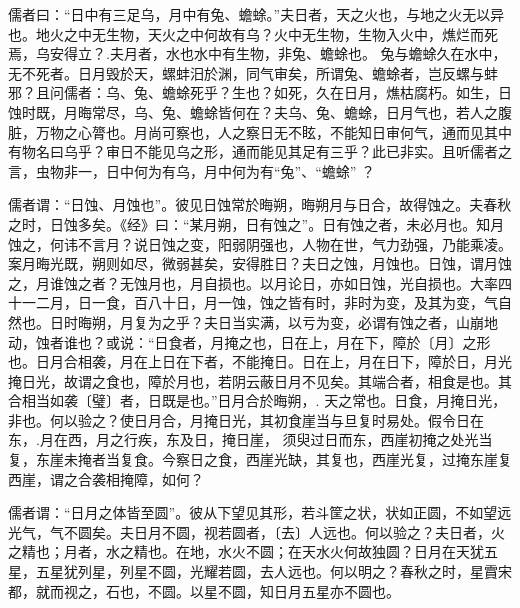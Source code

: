 \documentclass[]{article}
\begin{document}
儒者曰：``日中有三足乌，月中有兔、蟾蜍。''夫日者，天之火也，与地之火无以异也。地火之中无生物，天火之中何故有乌？火中无生物，生物入火中，燋烂而死焉，乌安得立？.夫月者，水也水中有生物，非兔、蟾蜍也。
兔与蟾蜍久在水中，无不死者。日月毁於天，螺蚌汨於渊，同气审矣，所谓兔、蟾蜍者，岂反螺与蚌邪？且问儒者：乌、兔、蟾蜍死乎？生也？如死，久在日月，燋枯腐朽。如生，日蚀时既，月晦常尽，乌、兔、蟾蜍皆何在？夫乌、兔、蟾蜍，日月气也，若人之腹脏，万物之心膂也。月尚可察也，人之察日无不眩，不能知日审何气，通而见其中有物名曰乌乎？审日不能见乌之形，通而能见其足有三乎？此已非实。且听儒者之言，虫物非一，日中何为有乌，月中何为有``兔''、``蟾蜍''
？

儒者谓：``日蚀、月蚀也''。彼见日蚀常於晦朔，晦朔月与日合，故得蚀之。夫春秋之时，日蚀多矣。《经》曰：``某月朔，日有蚀之''。日有蚀之者，未必月也。知月蚀之，何讳不言月？说日蚀之变，阳弱阴强也，人物在世，气力劲强，乃能乘凌。案月晦光既，朔则如尽，微弱甚矣，安得胜日？夫日之蚀，月蚀也。日蚀，谓月蚀之，月谁蚀之者？无蚀月也，月自损也。以月论日，亦如日蚀，光自损也。大率四十一二月，日一食，百八十日，月一蚀，蚀之皆有时，非时为变，及其为变，气自然也。日时晦朔，月复为之乎？夫日当实满，以亏为变，必谓有蚀之者，山崩地动，蚀者谁也？或说：``日食者，月掩之也，日在上，月在下，障於〔月〕之形也。日月合相袭，月在上日在下者，不能掩日。日在上，月在日下，障於日，月光掩日光，故谓之食也，障於月也，若阴云蔽日月不见矣。其端合者，相食是也。其合相当如袭〔璧〕者，日既是也。''日月合於晦朔，.
天之常也。日食，月掩日光，非也。何以验之？使日月合，月掩日光，其初食崖当与旦复时易处。假令日在东，.月在西，月之行疾，东及日，掩日崖，
须臾过日而东，西崖初掩之处光当复，东崖未掩者当复食。今察日之食，西崖光缺，其复也，西崖光复，过掩东崖复西崖，谓之合袭相掩障，如何？

儒者谓：``日月之体皆至圆''。彼从下望见其形，若斗筐之状，状如正圆，不如望远光气，气不圆矣。夫日月不圆，视若圆者，〔去〕人远也。何以验之？夫日者，火之精也；月者，水之精也。在地，水火不圆；在天水火何故独圆？日月在天犹五星，五星犹列星，列星不圆，光耀若圆，去人远也。何以明之？春秋之时，星霣宋都，就而视之，石也，不圆。以星不圆，知日月五星亦不圆也。
\end{document}
